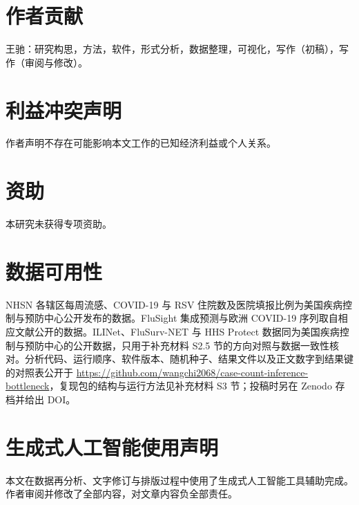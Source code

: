 \section*{作者贡献}
王驰：研究构思，方法，软件，形式分析，数据整理，可视化，写作（初稿），写作（审阅与修改）。

\section*{利益冲突声明}
作者声明不存在可能影响本文工作的已知经济利益或个人关系。

\section*{资助}
本研究未获得专项资助。

\section*{数据可用性}
NHSN 各辖区每周流感、COVID-19 与 RSV 住院数及医院填报比例为美国疾病控制与预防中心公开发布的数据\citep{cdc2026nhsn}。FluSight 集成预测与欧洲 COVID-19 序列取自相应文献公开的数据\citep{mathis2024evaluation, flaxman2020estimating}。ILINet、FluSurv-NET 与 HHS Protect 数据同为美国疾病控制与预防中心的公开数据，只用于补充材料 S2.5 节的方向对照与数据一致性核对。分析代码、运行顺序、软件版本、随机种子、结果文件以及正文数字到结果键的对照表公开于 \url{https://github.com/wangchi2068/case-count-inference-bottleneck}，复现包的结构与运行方法见补充材料 S3 节；投稿时另在 Zenodo 存档并给出 DOI。

\section*{生成式人工智能使用声明}
本文在数据再分析、文字修订与排版过程中使用了生成式人工智能工具辅助完成。作者审阅并修改了全部内容，对文章内容负全部责任。
